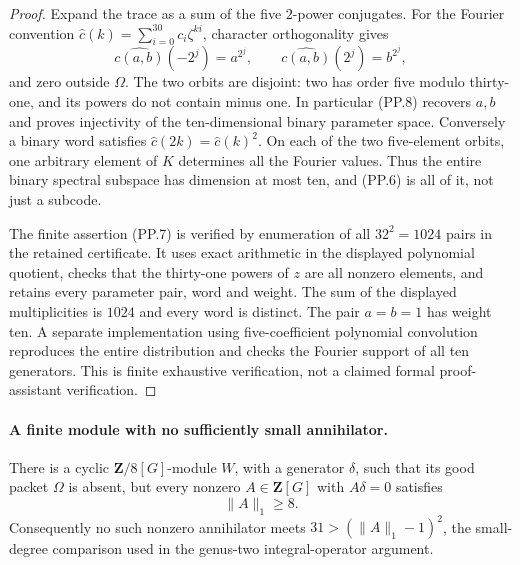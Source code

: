 \documentclass[11pt,a4paper]{article}
\begin{document}
\begin{proof}
Expand the trace as a sum of the five $2$-power conjugates.
For the Fourier convention
$\widehat c(k)=\sum_{i=0}^{30}c_i\zeta^{ki}$, character
orthogonality gives
\[
 \widehat{c(a,b)}(-2^j)=a^{2^j},\qquad
 \widehat{c(a,b)}(2^j)=b^{2^j},
 \tag{PP.8}
\]
and zero outside $\Omega$. The two orbits are disjoint:
two has order five modulo thirty-one, and its powers do not
contain minus one. In particular (PP.8) recovers $a,b$ and
proves injectivity of the ten-dimensional binary parameter
space. Conversely a binary word satisfies
$\widehat c(2k)=\widehat c(k)^2$.
On each of the two five-element orbits, one arbitrary element
of $K$ determines all the Fourier values. Thus the entire
binary spectral subspace has dimension at most ten, and
(PP.6) is all of it, not just a subcode.

The finite assertion (PP.7) is verified by enumeration of all
$32^2=1024$ pairs in the retained certificate. It uses exact
arithmetic in the displayed polynomial quotient, checks that
the thirty-one powers of $z$ are all nonzero elements, and
retains every parameter pair, word and weight. The sum of
the displayed multiplicities is $1024$ and every word is distinct.
The pair $a=b=1$ has weight ten. A separate implementation
using five-coefficient polynomial convolution reproduces
the entire distribution and checks the Fourier support of
all ten generators. This is finite exhaustive verification,
not a claimed formal proof-assistant verification.
\end{proof}

\paragraph{A finite module with no sufficiently small annihilator.}
There is a cyclic $\mathbf Z/8[G]$-module $W$, with a generator
$\delta$, such that its good packet $\Omega$ is absent, but
every nonzero $A\in\mathbf Z[G]$ with $A\delta=0$ satisfies
\[
                         \|A\|_1\ge8.
 \tag{PP.9}
\]
Consequently no such nonzero annihilator meets
$31>(\|A\|_1-1)^2$, the small-degree comparison used in
the genus-two integral-operator argument.
\end{document}

